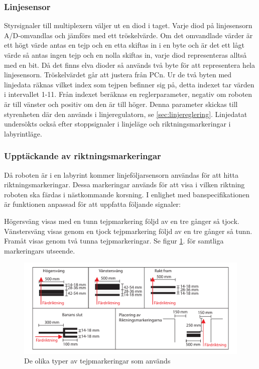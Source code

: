 \subsubsection{Linjesensor}
\label{sec:linjesensor}
Styrsignaler till multiplexern väljer ut en diod i taget.
Varje diod på linjesensorn A/D-omvandlas och jämförs med ett tröskelvärde. Om
det omvandlade värder är
ett högt värde antas en tejp och en etta skiftas in i en byte och är det 
ett lågt värde så antas ingen tejp och en nolla skiftas in, varje diod
representeras alltså med en bit. Då det finns elva dioder så används två byte 
för att representera hela linjesensorn. Tröskelvärdet går att justera från PCn. 
Ur de två byten med linjedata räknas vilket index som tejpen befinner sig på,
detta indexet tar värden i intervallet 1-11. Från indexet beräknas en
reglerparameter, negativ om roboten är till vänster och positiv om den är till
höger. Denna parameter skickas till styrenheten där den används i
linjeregulatorn, se \ref{sec:linjereglering}. Linjedatat undersökts också efter
stoppsignaler i linjeläge och riktningsmarkeringar i labyrintläge.

\subsubsection{Upptäckande av riktningsmarkeringar}
\label{sec:riktmark}
Då roboten är i en labyrint kommer linjeföljarsensorn användas 
för att hitta riktningsmarkeringar. Dessa markeringar används för att visa i 
vilken riktning roboten ska färdas i nästkommande korsning.  I enlighet med 
banspecifikationen är funktionen anpassad för att uppfatta 
följande signaler:

Högersväng visas med en tunn tejpmarkering följd av en tre gånger så tjock.
Vänstersväng visas genom en tjock tejpmarkering följd av en tre gånger så tunn.
Framåt visas genom två tunna tejpmarkeringar. Se figur \ref{fig:tejpmarkeringar}.
för samtliga markeringars utseende.

\begin{figure}[H]
  \centering
 \includegraphics[angle=0,scale=0.5]{bilder/tejpmarkeringar.pdf}
  \caption{De olika typer av tejpmarkeringar som används}
  \label{fig:tejpmarkeringar}
\end{figure}


